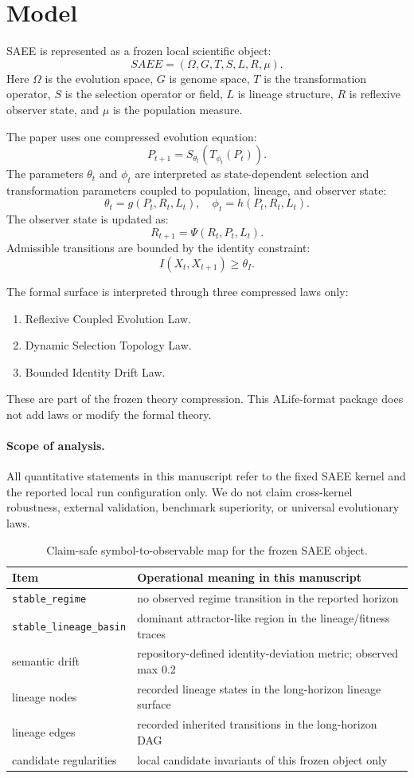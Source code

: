 \section{Model}

SAEE is represented as a frozen local scientific object:
\[
  SAEE = (\Omega, G, T, S, L, R, \mu).
\]
Here $\Omega$ is the evolution space, $G$ is genome space, $T$ is the
transformation operator, $S$ is the selection operator or field, $L$ is lineage
structure, $R$ is reflexive observer state, and $\mu$ is the population
measure.

The paper uses one compressed evolution equation:
\[
  P_{t+1} = S_{\theta_t}(T_{\phi_t}(P_t)).
\]
The parameters $\theta_t$ and $\phi_t$ are interpreted as state-dependent
selection and transformation parameters coupled to population, lineage, and
observer state:
\[
  \theta_t = g(P_t, R_t, L_t), \quad
  \phi_t = h(P_t, R_t, L_t).
\]
The observer state is updated as:
\[
  R_{t+1} = \Psi(R_t, P_t, L_t).
\]
Admissible transitions are bounded by the identity constraint:
\[
  I(X_t, X_{t+1}) \geq \theta_I.
\]

The formal surface is interpreted through three compressed laws only:
\begin{enumerate}
  \item Reflexive Coupled Evolution Law.
  \item Dynamic Selection Topology Law.
  \item Bounded Identity Drift Law.
\end{enumerate}
These are part of the frozen theory compression. This ALife-format package
does not add laws or modify the formal theory.

\paragraph{Scope of analysis.}
All quantitative statements in this manuscript refer to the fixed SAEE kernel
and the reported local run configuration only. We do not claim cross-kernel
robustness, external validation, benchmark superiority, or universal
evolutionary laws.

\begin{table}[t]
\centering
\begin{tabular}{ll}
\toprule
Item & Operational meaning in this manuscript \\
\midrule
\texttt{stable\_regime} & no observed regime transition in the reported horizon \\
\texttt{stable\_lineage\_basin} & dominant attractor-like region in the lineage/fitness traces \\
semantic drift & repository-defined identity-deviation metric; observed max 0.2 \\
lineage nodes & recorded lineage states in the long-horizon lineage surface \\
lineage edges & recorded inherited transitions in the long-horizon DAG \\
candidate regularities & local candidate invariants of this frozen object only \\
\bottomrule
\end{tabular}
\caption{Claim-safe symbol-to-observable map for the frozen SAEE object.}
\label{tab:claim-safe-map}
\end{table}
